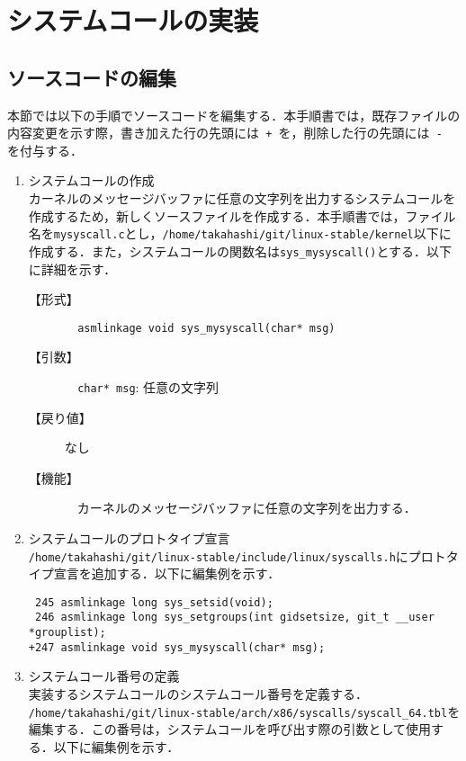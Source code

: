 \documentclass[12pt]{jsarticle}
\begin{document}
\newpage
\section{システムコールの実装}
\label{sec:overview}
\subsection{ソースコードの編集}
本節では以下の手順でソースコードを編集する．本手順書では，既存ファイルの内容変更を示す際，書き加えた行の先頭には\verb| + |を，削除した行の先頭には\verb| - |を付与する．
\begin{enumerate}
\item システムコールの作成\\
  カーネルのメッセージバッファに任意の文字列を出力するシステムコールを作成するため，新しくソースファイルを作成する．本手順書では，ファイル名を\verb|mysyscall.c|とし，\verb|/home/takahashi/git/linux-stable/kernel|以下に作成する．また，システムコールの関数名は\verb|sys_mysyscall()|とする．以下に詳細を示す．
  \begin{description}
  \item[【形式】] \verb|  asmlinkage void sys_mysyscall(char* msg)|
  \item[【引数】] \verb|  char* msg|: 任意の文字列
  \item[【戻り値】] なし
  \item[【機能】] 　カーネルのメッセージバッファに任意の文字列を出力する．
  \end{description}

\item システムコールのプロトタイプ宣言\\
  \verb|/home/takahashi/git/linux-stable/include/linux/syscalls.h|にプロトタイプ宣言を追加する．以下に編集例を示す．

\begin{verbatim}
 245 asmlinkage long sys_setsid(void);
 246 asmlinkage long sys_setgroups(int gidsetsize, git_t __user *grouplist);
+247 asmlinkage void sys_mysyscall(char* msg);
\end{verbatim}

  \item システムコール番号の定義\\
    実装するシステムコールのシステムコール番号を定義する． \\
    \verb|/home/takahashi/git/linux-stable/arch/x86/syscalls/syscall_64.tbl|を編集する．この番号は，システムコールを呼び出す際の引数として使用する．以下に編集例を示す．


\end{enumerate}
\end{document}
